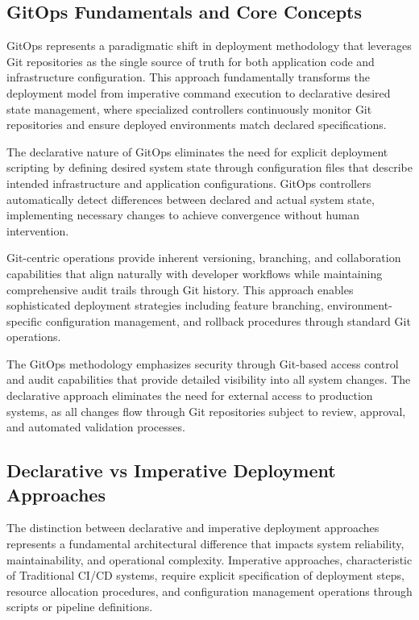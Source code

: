\subsection{GitOps Fundamentals and Core Concepts}

GitOps represents a paradigmatic shift in deployment methodology that leverages Git repositories as the single source of truth for both application code and infrastructure configuration. This approach fundamentally transforms the deployment model from imperative command execution to declarative desired state management, where specialized controllers continuously monitor Git repositories and ensure deployed environments match declared specifications.

The declarative nature of GitOps eliminates the need for explicit deployment scripting by defining desired system state through configuration files that describe intended infrastructure and application configurations. GitOps controllers automatically detect differences between declared and actual system state, implementing necessary changes to achieve convergence without human intervention.

Git-centric operations provide inherent versioning, branching, and collaboration capabilities that align naturally with developer workflows while maintaining comprehensive audit trails through Git history. This approach enables sophisticated deployment strategies including feature branching, environment-specific configuration management, and rollback procedures through standard Git operations.

The GitOps methodology emphasizes security through Git-based access control and audit capabilities that provide detailed visibility into all system changes. The declarative approach eliminates the need for external access to production systems, as all changes flow through Git repositories subject to review, approval, and automated validation processes.

\subsection{Declarative vs Imperative Deployment Approaches}

The distinction between declarative and imperative deployment approaches represents a fundamental architectural difference that impacts system reliability, maintainability, and operational complexity. Imperative approaches, characteristic of Traditional CI/CD systems, require explicit specification of deployment steps, resource allocation procedures, and configuration management operations through scripts or pipeline definitions.


